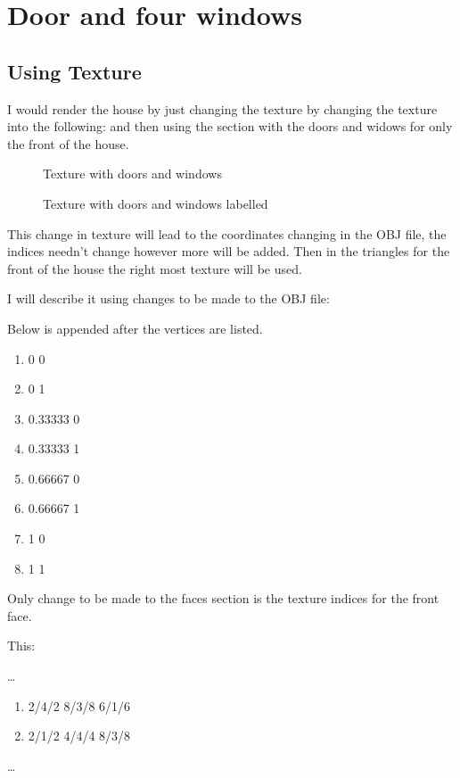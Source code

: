 \documentclass[10pt]{report}
\begin{document}
\section{Door and four windows}

\subsection{Using Texture}

I would render the house by just changing the texture by changing the texture into the following: and then using the section with the doors and widows for only the front of the house.

\begin{figure}[H]
    \centering
    \caption{Texture with doors and windows}
\end{figure}

\begin{figure}[H]
    \centering
    \caption{Texture with doors and windows labelled}
\end{figure}


This change in texture will lead to the coordinates changing in the OBJ file, the indices needn't change however more will be added. Then in the triangles for the front of the house the right most texture will be used.


I will describe it using changes to be made to the OBJ file:

Below is appended after the vertices are listed.
\begin{enumerate}[vt ]
    \item 0 0  %
    \item 0 1  %
    \item 0.33333 0  %
    \item 0.33333 1  %
    \item 0.66667 0  %
    \item 0.66667 1  %
    \item 1 0 %
    \item 1 1 %
\end{enumerate}

Only change to be made to the faces section is the texture indices for the front face.

This: 

\dots
\begin{enumerate}[f]
    \item 2/4/2 8/3/8 6/1/6
    \item 2/1/2 4/4/4 8/3/8
\end{enumerate}
\dots
\end{document}
